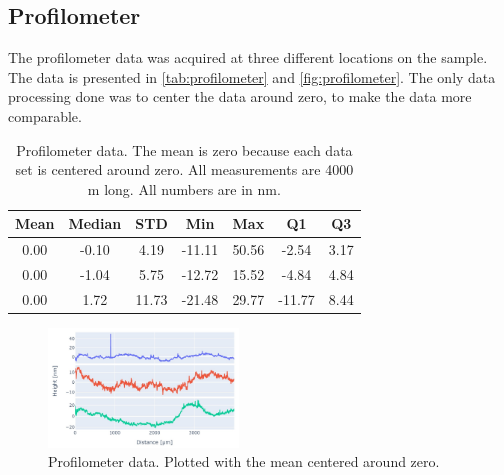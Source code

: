 
\subsection{Profilometer}
\label{results:profilometer}

The profilometer data was acquired at three different locations on the sample. 
The data is presented in \autoref{tab:profilometer} and \autoref{fig:profilometer}.
The only data processing done was to center the data around zero, to make the data more comparable.

\begin{table}[ht]
    \centering
    \caption{
    Profilometer data.
    The mean is zero because each data set is centered around zero.
    All measurements are 4000 \textmu m long.
    All numbers are in nm.
    }
    \begin{tabular}{ccccccc}
        Mean &     Median &        STD &        Min &        Max &        Q1 &        Q3 \\
        \hline
        0.00 &      -0.10 &       4.19 &     -11.11 &      50.56 &      -2.54 &       3.17 \\
        0.00 &      -1.04 &       5.75 &     -12.72 &      15.52 &      -4.84 &       4.84 \\
        0.00 &       1.72 &      11.73 &     -21.48 &      29.77 &     -11.77 &       8.44 \\
    \end{tabular}
    \label{tab:profilometer}
\end{table}



\begin{figure}[ht]
    \centering
    \includegraphics[width=0.45\textwidth]{figures/profilometer_graph.jpg}
    \caption{Profilometer data. 
    Plotted with the mean centered around zero.}
    \label{fig:profilometer}
\end{figure}



